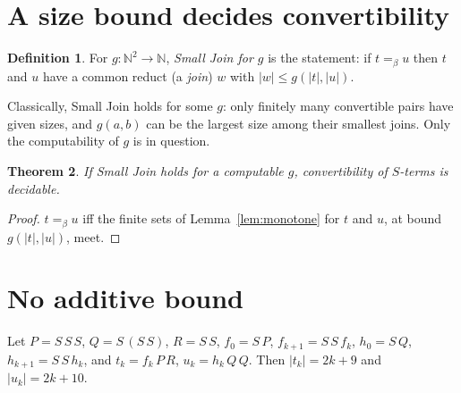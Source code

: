 \documentclass[11pt]{amsart}
\newtheorem{theorem}{Theorem}
\theoremstyle{definition}
\newtheorem{definition}[theorem]{Definition}
\newcommand{\conv}{=_{\beta}}
\newcommand{\sz}[1]{|#1|}
\begin{document}
\section{A size bound decides convertibility}

\begin{definition}
For $g\colon\mathbb N^2\to\mathbb N$, \emph{Small Join for $g$} is the statement: if $t\conv u$ then
$t$ and $u$ have a common reduct (a \emph{join}) $w$ with $\sz w\le g(\sz t,\sz u)$.
\end{definition}

Classically, Small Join holds for some $g$: only finitely many convertible pairs have given sizes,
and $g(a,b)$ can be the largest size among their smallest joins. Only the computability of $g$ is
in question.

\begin{theorem}\label{thm:smalljoin}
If Small Join holds for a computable $g$, convertibility of $S$-terms is decidable.
\end{theorem}
\begin{proof}
$t\conv u$ iff the finite sets of Lemma~\ref{lem:monotone} for $t$ and $u$, at bound
$g(\sz t,\sz u)$, meet.
\end{proof}

\section{No additive bound}

Let $P=S\,S\,S$, $Q=S\,(S\,S)$, $R=S\,S$, $f_0=S\,P$, $f_{k+1}=S\,S\,f_k$, $h_0=S\,Q$,
$h_{k+1}=S\,S\,h_k$, and $t_k=f_k\,P\,R$, $u_k=h_k\,Q\,Q$. Then $\sz{t_k}=2k+9$ and
$\sz{u_k}=2k+10$.
\end{document}
